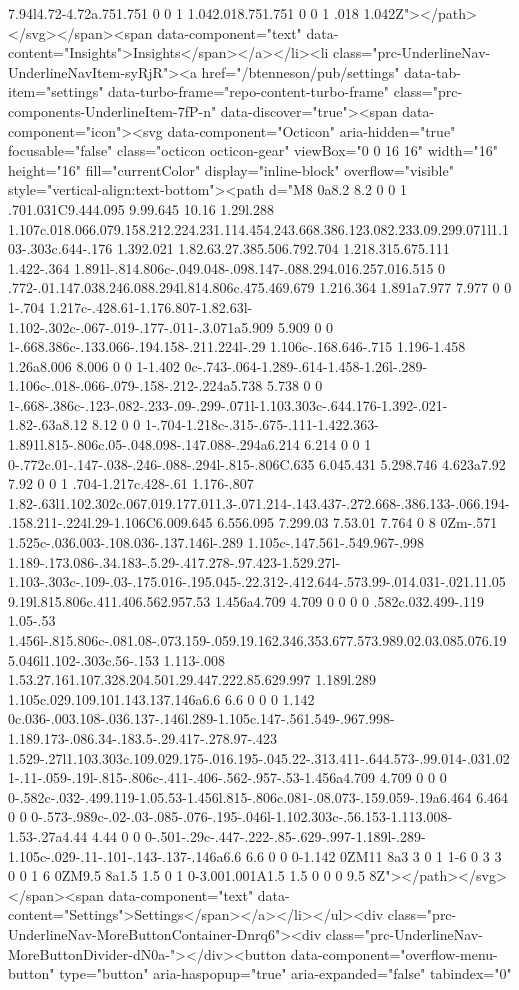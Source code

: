 {{{7.94l4.72-4.72a.751.751 0 0 1 1.042.018.751.751 0 0 1 .018 1.042Z"></path></svg></span><span data-component="text" data-content="Insights">Insights</span></a></li><li class="prc-UnderlineNav-UnderlineNavItem-syRjR"><a href="/btenneson/pub/settings" data-tab-item="settings" data-turbo-frame="repo-content-turbo-frame" class="prc-components-UnderlineItem-7fP-n" data-discover="true"><span data-component="icon"><svg data-component="Octicon" aria-hidden="true" focusable="false" class="octicon octicon-gear" viewBox="0 0 16 16" width="16" height="16" fill="currentColor" display="inline-block" overflow="visible" style="vertical-align:text-bottom"><path d="M8 0a8.2 8.2 0 0 1 .701.031C9.444.095 9.99.645 10.16 1.29l.288 1.107c.018.066.079.158.212.224.231.114.454.243.668.386.123.082.233.09.299.071l1.103-.303c.644-.176 1.392.021 1.82.63.27.385.506.792.704 1.218.315.675.111 1.422-.364 1.891l-.814.806c-.049.048-.098.147-.088.294.016.257.016.515 0 .772-.01.147.038.246.088.294l.814.806c.475.469.679 1.216.364 1.891a7.977 7.977 0 0 1-.704 1.217c-.428.61-1.176.807-1.82.63l-1.102-.302c-.067-.019-.177-.011-.3.071a5.909 5.909 0 0 1-.668.386c-.133.066-.194.158-.211.224l-.29 1.106c-.168.646-.715 1.196-1.458 1.26a8.006 8.006 0 0 1-1.402 0c-.743-.064-1.289-.614-1.458-1.26l-.289-1.106c-.018-.066-.079-.158-.212-.224a5.738 5.738 0 0 1-.668-.386c-.123-.082-.233-.09-.299-.071l-1.103.303c-.644.176-1.392-.021-1.82-.63a8.12 8.12 0 0 1-.704-1.218c-.315-.675-.111-1.422.363-1.891l.815-.806c.05-.048.098-.147.088-.294a6.214 6.214 0 0 1 0-.772c.01-.147-.038-.246-.088-.294l-.815-.806C.635 6.045.431 5.298.746 4.623a7.92 7.92 0 0 1 .704-1.217c.428-.61 1.176-.807 1.82-.63l1.102.302c.067.019.177.011.3-.071.214-.143.437-.272.668-.386.133-.066.194-.158.211-.224l.29-1.106C6.009.645 6.556.095 7.299.03 7.53.01 7.764 0 8 0Zm-.571 1.525c-.036.003-.108.036-.137.146l-.289 1.105c-.147.561-.549.967-.998 1.189-.173.086-.34.183-.5.29-.417.278-.97.423-1.529.27l-1.103-.303c-.109-.03-.175.016-.195.045-.22.312-.412.644-.573.99-.014.031-.021.11.059.19l.815.806c.411.406.562.957.53 1.456a4.709 4.709 0 0 0 0 .582c.032.499-.119 1.05-.53 1.456l-.815.806c-.081.08-.073.159-.059.19.162.346.353.677.573.989.02.03.085.076.195.046l1.102-.303c.56-.153 1.113-.008 1.53.27.161.107.328.204.501.29.447.222.85.629.997 1.189l.289 1.105c.029.109.101.143.137.146a6.6 6.6 0 0 0 1.142 0c.036-.003.108-.036.137-.146l.289-1.105c.147-.561.549-.967.998-1.189.173-.086.34-.183.5-.29.417-.278.97-.423 1.529-.27l1.103.303c.109.029.175-.016.195-.045.22-.313.411-.644.573-.99.014-.031.021-.11-.059-.19l-.815-.806c-.411-.406-.562-.957-.53-1.456a4.709 4.709 0 0 0 0-.582c-.032-.499.119-1.05.53-1.456l.815-.806c.081-.08.073-.159.059-.19a6.464 6.464 0 0 0-.573-.989c-.02-.03-.085-.076-.195-.046l-1.102.303c-.56.153-1.113.008-1.53-.27a4.44 4.44 0 0 0-.501-.29c-.447-.222-.85-.629-.997-1.189l-.289-1.105c-.029-.11-.101-.143-.137-.146a6.6 6.6 0 0 0-1.142 0ZM11 8a3 3 0 1 1-6 0 3 3 0 0 1 6 0ZM9.5 8a1.5 1.5 0 1 0-3.001.001A1.5 1.5 0 0 0 9.5 8Z"></path></svg></span><span data-component="text" data-content="Settings">Settings</span></a></li></ul><div class="prc-UnderlineNav-MoreButtonContainer-Dnrq6"><div class="prc-UnderlineNav-MoreButtonDivider-dN0a-"></div><button data-component="overflow-menu-button" type="button" aria-haspopup="true" aria-expanded="false" tabindex="0" }}}
